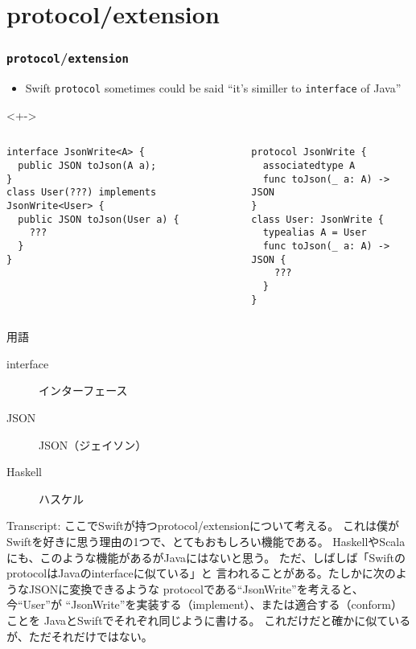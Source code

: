 \section{protocol/extension}

\begin{frame}[fragile]
  \frametitle{\texttt{protocol}/\texttt{extension}}

  \pause
  \begin{itemize}
    \item<+-> Swift \lstinline|protocol| sometimes could be said
    ``it's similler to \lstinline|interface| of Java''
  \end{itemize}

  \begin{uncoverenv}<+->
    \begin{columns}
      \begin{column}{0.55\textwidth}
\begin{lstlisting}[style=java, caption={Java interface}]
interface JsonWrite<A> {
  public JSON toJson(A a);
}
class User(???) implements JsonWrite<User> {
  public JSON toJson(User a) {
    ???
  }
}
\end{lstlisting}
    \end{column}
    \begin{column}{0.45\textwidth}
\begin{lstlisting}[style=swift, caption={Swift protocol}]
protocol JsonWrite {
  associatedtype A
  func toJson(_ a: A) -> JSON
}
class User: JsonWrite {
  typealias A = User
  func toJson(_ a: A) -> JSON {
    ???
  }
}
\end{lstlisting}
      \end{column}
    \end{columns}
  \end{uncoverenv}


  \begin{notes}
    \item 用語
    \begin{description}
      \item[interface] インターフェース
      \item[JSON] JSON（ジェイソン）
      \item[Haskell] ハスケル
    \end{description}

    \item Transcript:
    ここでSwiftが持つprotocol/extensionについて考える。
    これは僕がSwiftを好きに思う理由の1つで、とてもおもしろい機能である。
    HaskellやScalaにも、このような機能があるがJavaにはないと思う。
    ただ、しばしば「SwiftのprotocolはJavaのinterfaceに似ている」と
    言われることがある。たしかに次のようなJSONに変換できるような
    protocolである``JsonWrite''を考えると、今``User''が
    ``JsonWrite''を実装する（implement）、または適合する（conform）ことを
    JavaとSwiftでそれぞれ同じように書ける。
    これだけだと確かに似ているが、ただそれだけではない。
  \end{notes}
\end{frame}

